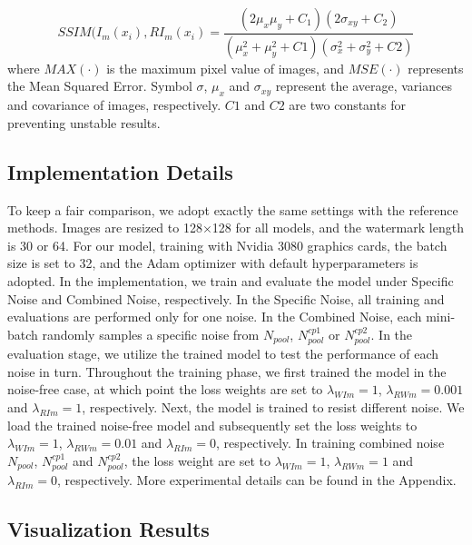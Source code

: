 \documentclass[sigconf]{acmart}
\begin{document}
\begin{equation}
    SSIM(I_{m}(x_{i}), RI_{m}(x_{i}) = \frac{(2\mu_{x}\mu_{y}+C_{1})(2\sigma_{xy}+C_{2})}{(\mu_{x}^{2}+\mu_{y}^{2}+C1)(\sigma_{x}^{2}+\sigma_{y}^{2}+C2)}
    \label{SSIM}
\end{equation}
where $MAX(\cdot)$ is the maximum pixel value of images, and $MSE(\cdot)$ represents the Mean Squared Error. Symbol $\sigma$, $\mu_{x}$ and $\sigma_{xy}$ represent the average, variances and covariance of images, respectively. $C1$ and $C2$ are two constants for preventing unstable results. 



\subsection{Implementation Details}

To keep a fair comparison, we adopt exactly the same settings with the reference methods. Images are resized to 128$\times$128 for all models, and the watermark length is 30 or 64. For our model, training with Nvidia 3080 graphics cards, the batch size is set to 32, and the Adam optimizer \cite{kingma2014adam} with default hyperparameters is adopted. In the implementation, we train and evaluate the model under Specific Noise and Combined Noise, respectively. In the Specific Noise, all training and evaluations are performed only for one noise. In the Combined Noise, each mini-batch randomly samples a specific noise from $N_{pool}$, $N^{cp1}_{pool}$ or $N^{cp2}_{pool}$. In the evaluation stage, we utilize the trained model to test the performance of each noise in turn. 
Throughout the training phase, we first trained the model in the noise-free case, at which point the loss weights are set to $\lambda_{WIm}=1$, $\lambda_{RWm}=0.001$ and $\lambda_{RIm}=1$, respectively. Next, the model is trained to resist different noise. We load the trained noise-free model and subsequently set the loss weights to $\lambda_{WIm}=1$, $\lambda_{RWm}=0.01$ and $\lambda_{RIm}=0$, respectively.  
In training combined noise $N_{pool}$, $N^{cp1}_{pool}$ and $N^{cp2}_{pool}$, the loss weight are set to $\lambda_{WIm}=1$, $\lambda_{RWm}=1$ and $\lambda_{RIm}=0$, respectively. 
More experimental details can be found in the Appendix.





\subsection{Visualization Results}
\end{document}
